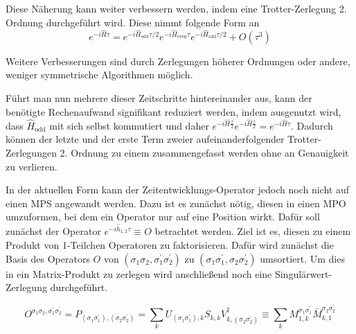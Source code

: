 \documentclass[10pt,a4paper]{report}
\begin{document}
Diese Näherung kann weiter verbessern werden, indem eine Trotter-Zerlegung 2. Ordnung durchgeführt wird. Diese nimmt folgende Form an
\begin{equation}
e^{-i\hat{H}\tau}=e^{-i\hat{H}_{\text{odd}}\tau/2}e^{-i\hat{H}_{\text{even}}\tau}e^{-i\hat{H}_{\text{odd}}\tau/2}+O(\tau^3)
\end{equation}

Weitere Verbesserungen sind durch Zerlegungen höherer Ordnungen oder andere, weniger symmetrische Algorithmen möglich.

Führt man nun mehrere dieser Zeitschritte hintereinander aus, kann der benötigte Rechenaufwand signifikant reduziert werden, indem ausgenutzt wird, dass $\hat{H}_{\text{odd}}$ mit sich selbst kommutiert und daher $e^{-i\hat{H}\frac{\tau}{2}}e^{-i\hat{H}\frac{\tau}{2}}=e^{-i\hat{H}\tau}$. Dadurch können der letzte und der erste Term zweier aufeinanderfolgender Trotter-Zerlegungen 2. Ordnung zu einem zusammengefasst werden ohne an Genauigkeit zu verlieren.\par

In der aktuellen Form kann der Zeitentwicklungs-Operator jedoch noch nicht auf einen MPS angewandt werden. Dazu ist es zunächst nötig, diesen in einen MPO umzuformen, bei dem ein Operator nur auf eine Position wirkt. Dafür soll zunächst der Operator $e^{-i\hat{h}_{1,2}\tau}\equiv O$ betrachtet werden. Ziel ist es, diesen zu einem Produkt von 1-Teilchen Operatoren zu faktorisieren. Dafür wird zunächst die Basis des Operators $O$ von $(\sigma_1\sigma_2,\sigma_1^{\prime}\sigma_2^{\prime})$ zu $(\sigma_1\sigma_1^{\prime},\sigma_2\sigma_2^{\prime})$ umsortiert. Um dies in ein Matrix-Produkt zu zerlegen wird anschließend noch eine Singulärwert-Zerlegung durchgeführt. 

\begin{equation}
O^{\sigma_1 \sigma_2,\sigma_1^\prime \sigma_2^\prime}=P_{(\sigma_1 \sigma_1^\prime),(\sigma_2 \sigma_2^\prime)}=\sum_k U_{(\sigma_1 \sigma_1^\prime),k}S_{k,k}V_{k,(\sigma_2 \sigma_2^\prime)}^\dagger\equiv\sum_k M_{1,k}^{\sigma_1 \sigma_1^\prime} \bar{M}_{k,1}^{\sigma_2 \sigma_2^\prime}
\end{equation}
\end{document}
